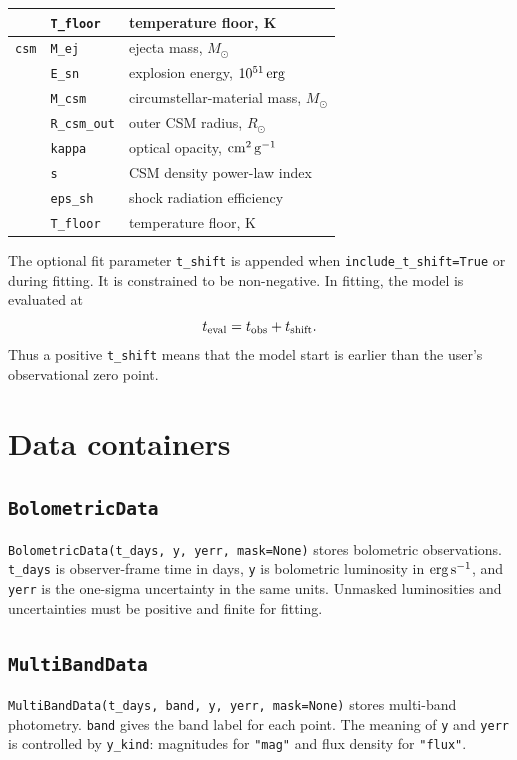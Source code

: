 \documentclass[11pt]{article}
\begin{document}
\begin{longtable}{lll}
 & \texttt{T\_floor} & temperature floor, K \\
\midrule
\texttt{csm} & \texttt{M\_ej} & ejecta mass, $M_\odot$ \\
 & \texttt{E\_sn} & explosion energy, $10^{51}\,{\rm erg}$ \\
 & \texttt{M\_csm} & circumstellar-material mass, $M_\odot$ \\
 & \texttt{R\_csm\_out} & outer CSM radius, $R_\odot$ \\
 & \texttt{kappa} & optical opacity, ${\rm cm^2\,g^{-1}}$ \\
 & \texttt{s} & CSM density power-law index \\
 & \texttt{eps\_sh} & shock radiation efficiency \\
 & \texttt{T\_floor} & temperature floor, K \\
\bottomrule
\end{longtable}

The optional fit parameter \texttt{t\_shift} is appended when
\texttt{include\_t\_shift=True} or during fitting.  It is constrained to be
non-negative.  In fitting, the model is evaluated at
\[
  t_{\rm eval}=t_{\rm obs}+t_{\rm shift}.
\]
Thus a positive \texttt{t\_shift} means that the model start is earlier than
the user's observational zero point.

\section{Data containers}

\subsection{\texttt{BolometricData}}

\texttt{BolometricData(t\_days, y, yerr, mask=None)} stores bolometric
observations.  \texttt{t\_days} is observer-frame time in days, \texttt{y} is
bolometric luminosity in ${\rm erg\,s^{-1}}$, and \texttt{yerr} is the
one-sigma uncertainty in the same units.  Unmasked luminosities and
uncertainties must be positive and finite for fitting.

\subsection{\texttt{MultiBandData}}

\texttt{MultiBandData(t\_days, band, y, yerr, mask=None)} stores multi-band
photometry.  \texttt{band} gives the band label for each point.  The meaning
of \texttt{y} and \texttt{yerr} is controlled by \texttt{y\_kind}: magnitudes
for \texttt{"mag"} and flux density for \texttt{"flux"}.
\end{document}
